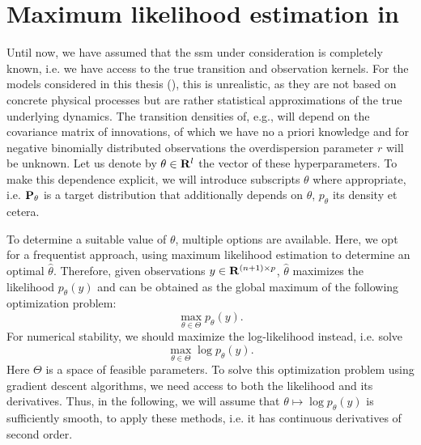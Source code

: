 \section{Maximum likelihood estimation in \texorpdfstring{}{SSMs}}
\label{sec:maximum_likelihood_estimation}

Until now, we have assumed that the \acrshort{ssm} under consideration is completely known, i.e. we have access to the true transition and observation kernels. For the models considered in this thesis (), this is unrealistic, as they are not based on concrete physical processes but are rather statistical approximations of the true underlying dynamics. The transition densities of, e.g.,  will depend on the covariance matrix of innovations, of which we have no a priori knowledge and for negative binomially distributed observations the overdispersion parameter $r$ will be unknown. Let us denote by $\theta\in\R^{l}$ the vector of these hyperparameters. 
To make this dependence explicit, we will introduce subscripts $\theta$ where appropriate, i.e. $\P_{\theta}$ is a target distribution that additionally depends on $\theta$, $p_{\theta}$ its density et cetera.

To determine a suitable value of $\theta$, multiple options are available. Here, we opt for a frequentist approach, using maximum likelihood estimation to determine an optimal $\hat \theta$. Therefore, given observations $y\in\R^{(n+1)\times p}$, $\hat\theta$ maximizes the likelihood $p_{\theta}(y)$ and can be obtained as the global maximum of the following optimization problem: 
$$
    \max_{\theta \in \Theta} p_{\theta}(y).
$$
For numerical stability, we should maximize the log-likelihood instead, i.e. solve 
$$
    \max_{\theta \in \Theta} \log p_{\theta}(y).
$$
Here $\Theta$ is a space of feasible parameters. To solve this optimization problem using gradient descent algorithms, we need access to both the likelihood and its derivatives. Thus, in the following, we will assume that $\theta \mapsto \log p_{\theta}(y)$ is sufficiently smooth, to apply these methods, i.e. it has continuous derivatives of second order. 

